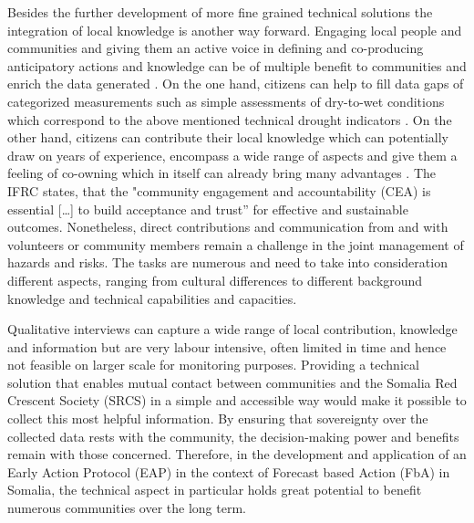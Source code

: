 Besides the further development of more fine grained technical solutions the integration of local knowledge is another way forward. Engaging local people and communities and giving them an active voice in defining and co-producing anticipatory actions and knowledge can be of multiple benefit to communities and enrich the data generated \autocite{somaliredcrescentsocietyFeasibilityStudyPotential2022, njambi-szlapkaIntegratingCommunityVoices, haokipIndigenousKnowledgeEarly2022}. On the one hand, citizens can help to fill data gaps of categorized measurements such as simple assessments of dry-to-wet conditions which correspond to the above mentioned technical drought indicators \autocite{lackstromBackyardHydroclimatologyCitizen2022}. On the other hand, citizens can contribute their local knowledge which can potentially draw on years of experience, encompass a wide range of aspects and give them a feeling of co-owning which in itself can already bring many advantages \autocite{njambi-szlapkaIntegratingCommunityVoices}\autocite{madrigalDeterminantsPerformanceCommunityBased2011}. The IFRC states, that the "community engagement and accountability (CEA) is essential […] to build acceptance and trust” \autocite{ifrcCommunityEngagementAccountability} for effective and sustainable outcomes. Nonetheless, direct contributions and communication from and with volunteers or community members remain a challenge in the joint management of hazards and risks. The tasks are numerous and need to take into consideration different aspects, ranging from cultural differences to different background knowledge and technical capabilities and capacities.

Qualitative interviews can capture a wide range of local contribution, knowledge and information but are very labour intensive, often limited in time and hence not feasible on larger scale for monitoring purposes. Providing a technical solution that enables mutual contact between communities and the Somalia Red Crescent Society (SRCS) in a simple and accessible way would make it possible to collect this most helpful information. By ensuring that sovereignty over the collected data rests with the community, the decision-making power and benefits remain with those concerned. Therefore, in the development and application of an Early Action Protocol (EAP) in the context of Forecast based Action (FbA) in Somalia, the technical aspect in particular holds great potential to benefit numerous communities over the long term.

